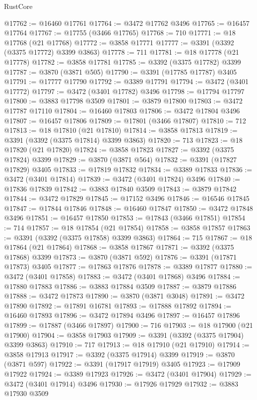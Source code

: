 \begin{lexlean}{RustCore}
\begin{coremodule}
@17762 := @16460 @17761
@17764 := @3472 @17762 @3496
@17765 := @16457 @17764
@17767 := @17755 (@3466 @17765)
@17768 := 710
@17771 := @18 @17768 (@21 @17768)
@17772 := @3858 @17771
@17777 := @3391 (@3392 (@3375 @17772) @3399 @3863)
@17778 := 711
@17781 := @18 @17778 (@21 @17778)
@17782 := @3858 @17781
@17785 := @3392 (@3375 @17782) @3399
@17787 := @3870 (@3871 @505)
@17790 := @3391 (@17785 @17787) @3405
@17791 := @17777 @17790
@17792 := @3389 @17791
@17794 := @3472 (@3401 @17772)
@17797 := @3472 (@3401 @17782) @3496
@17798 := @17794 @17797
@17800 := @3883 @17798 @3509
@17801 := @3879 @17800
@17803 := @3472 @17787 @17110
@17804 := @16460 @17803
@17806 := @3472 @17804 @3496
@17807 := @16457 @17806
@17809 := @17801 (@3466 @17807)
@17810 := 712
@17813 := @18 @17810 (@21 @17810)
@17814 := @3858 @17813
@17819 := @3391 (@3392 (@3375 @17814) @3399 @3863)
@17820 := 713
@17823 := @18 @17820 (@21 @17820)
@17824 := @3858 @17823
@17827 := @3392 (@3375 @17824) @3399
@17829 := @3870 (@3871 @564)
@17832 := @3391 (@17827 @17829) @3405
@17833 := @17819 @17832
@17834 := @3389 @17833
@17836 := @3472 (@3401 @17814)
@17839 := @3472 (@3401 @17824) @3496
@17840 := @17836 @17839
@17842 := @3883 @17840 @3509
@17843 := @3879 @17842
@17844 := @3472 @17829
@17845 := @17152 @3496
@17846 := @16546 @17845
@17847 := @17844 @17846
@17848 := @16460 @17847
@17850 := @3472 @17848 @3496
@17851 := @16457 @17850
@17853 := @17843 (@3466 @17851)
@17854 := 714
@17857 := @18 @17854 (@21 @17854)
@17858 := @3858 @17857
@17863 := @3391 (@3392 (@3375 @17858) @3399 @3863)
@17864 := 715
@17867 := @18 @17864 (@21 @17864)
@17868 := @3858 @17867
@17871 := @3392 (@3375 @17868) @3399
@17873 := @3870 (@3871 @592)
@17876 := @3391 (@17871 @17873) @3405
@17877 := @17863 @17876
@17878 := @3389 @17877
@17880 := @3472 (@3401 @17858)
@17883 := @3472 (@3401 @17868) @3496
@17884 := @17880 @17883
@17886 := @3883 @17884 @3509
@17887 := @3879 @17886
@17888 := @3472 @17873
@17890 := @3870 (@3871 @3048)
@17891 := @3472 @17890
@17892 := @17891 @16781
@17893 := @17888 @17892
@17894 := @16460 @17893
@17896 := @3472 @17894 @3496
@17897 := @16457 @17896
@17899 := @17887 (@3466 @17897)
@17900 := 716
@17903 := @18 @17900 (@21 @17900)
@17904 := @3858 @17903
@17909 := @3391 (@3392 (@3375 @17904) @3399 @3863)
@17910 := 717
@17913 := @18 @17910 (@21 @17910)
@17914 := @3858 @17913
@17917 := @3392 (@3375 @17914) @3399
@17919 := @3870 (@3871 @597)
@17922 := @3391 (@17917 @17919) @3405
@17923 := @17909 @17922
@17924 := @3389 @17923
@17926 := @3472 (@3401 @17904)
@17929 := @3472 (@3401 @17914) @3496
@17930 := @17926 @17929
@17932 := @3883 @17930 @3509

\end{coremodule}
\end{lexlean}
